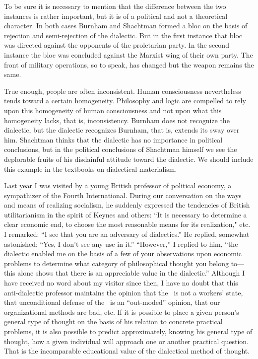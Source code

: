 To be sure it is necessary to mention that the difference between the two instances is rather important, but it is of a political and not a theoretical character. In both cases Burnham and Shachtman formed a bloc on the basis of rejection and semi-rejection of the dialectic. But in the first instance that bloc was directed against the opponents of the proletarian party. In the second instance the bloc was concluded against the Marxist wing of their own party. The front of military operations, so to speak, has changed but the weapon remains the same.

True enough, people are often inconsistent. Human consciousness nevertheless tends toward a certain homogeneity. Philosophy and logic are compelled to rely upon this homogeneity of human consciousness and not upon what this homogeneity lacks, that is, inconsistency. Burnham does not recognize the dialectic, but the dialectic recognizes Burnham, that is, extends its sway over him. Shachtman thinks that the dialectic has no importance in political conclusions, but in the political conclusions of Shachtman himself we see the deplorable fruits of his disdainful attitude toward the dialectic. We should include this example in the textbooks on dialectical materialism.
\noclub

Last year I was visited by a young British professor of political economy, a sympathizer of the Fourth International. During our conversation on the ways and means of realizing socialism, he suddenly expressed the tendencies of British utilitarianism in the spirit of Keynes and others: “It is necessary to determine a clear economic end, to choose the most reasonable means for its realization," etc. I remarked: “I see that you are an adversary of dialectics.” He replied, somewhat astonished: “Yes, I don’t see any use in it.” “However,” I replied to him, “the dialectic enabled me on the basis of a few of your observations upon economic problems to determine what category of philosophical thought you belong to---this alone shows that there is an appreciable value in the dialectic.” Although I have received no word about my visitor since then, I have no doubt that this anti-dialectic professor maintains the opinion that the \USSR\ is not a workers’ state, that unconditional defense of the \USSR\ is an “out-moded” opinion, that our organizational methods are bad, etc. If it is possible to place a given person’s general type of thought on the basis of his relation to concrete practical problems, it is also possible to predict approximately, knowing his general type of thought, how a given individual will approach one or another practical question. That is the incomparable educational value of the dialectical method of thought.


